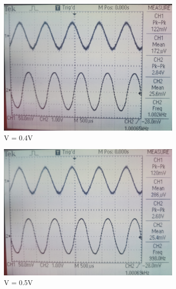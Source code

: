 \documentclass[12pt]{article}
\begin{document}
\begin{figure}[H]
\begin{subfigure}[b]{0.45\linewidth}
		\includegraphics[width = \linewidth, trim = {0 0 0 0}, clip]{PartD_3.jpg}
		\caption{V = 0.4V}
	\end{subfigure}
	\begin{subfigure}[b]{0.45\linewidth}
		\centering
		\includegraphics[width = \linewidth, trim = {0 0 0 0}, clip]{PartD_4.jpg}
		\caption{V = 0.5V}
	\end{subfigure}
	\begin{subfigure}[b]{0.45\linewidth}
		\centering

\end{subfigure}
\end{figure}
\end{document}
